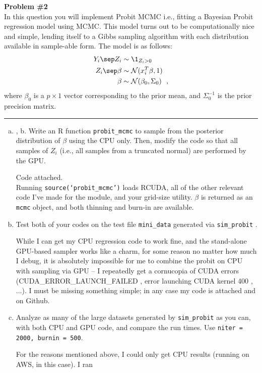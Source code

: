 \documentclass[12pt,letterpaper]{article}
\def\N{{\mathcal N}}
\begin{document}
\smallskip

\textbf{Problem \#2} \\ In this question you will implement Probit MCMC i.e., fitting a Bayesian Probit regression model using MCMC. This model turns out to be computationally nice and simple, lending itself to a Gibbs sampling algorithm with each distribution available in sample-able form. The model is as follows:
\begin{align*} 
Y_i \sep Z_i &\sim \1_{Z_i>0} \\
Z_i \sep \beta &\sim \N(x_i^T \beta,1) \\
\beta &\sim \N(\beta_0,\Sigma_0)~~,
\end{align*}
where $\beta_0$ is a $p\times 1$ vector corresponding to the prior mean, and $\Sigma_0^{-1}$ is the prior precision matrix. \hrule \smallskip
\begin{enumerate}[a.]
\item , b. Write an R function \texttt{probit\_mcmc} to sample from the posterior distribution of $\beta$ using the CPU only. Then, modify the code so that all samples of $Z_i$ (i.e., all samples from a truncated normal) are performed by the GPU. 

\textsf{Code attached.} \\ Running \texttt{source(`probit\_mcmc')} loads RCUDA, all of the other relevant code I've made for the module, and your grid-size utility. $\beta$ is returned as an \texttt{mcmc} object, and both thinning and burn-in are available. 

\addtocounter{enumi}{1} \item Test both of your codes on the test file \texttt{mini\_data} generated via \texttt{sim\_probit} . 

While I can get my CPU regression code to work fine, and the stand-alone GPU-based sampler works like a charm, for some reason no matter how much I debug, it is absolutely impossible for me to combine the probit on CPU with sampling via GPU -- I repeatedly get a cornucopia of CUDA errors (CUDA\_ERROR\_LAUNCH\_FAILED , error launching CUDA kernel 400 , $\ldots$). I must be missing something simple; in any case my code is attached and on Github. 

\item Analyze as many of the large datasets generated by \texttt{sim\_probit} as you can, with both CPU and GPU code, and compare the run times. Use \texttt{niter = 2000, burnin = 500}. 

For the reasons mentioned above, I could only get CPU results (running on AWS, in this case). I ran


\end{enumerate}
\end{document}
